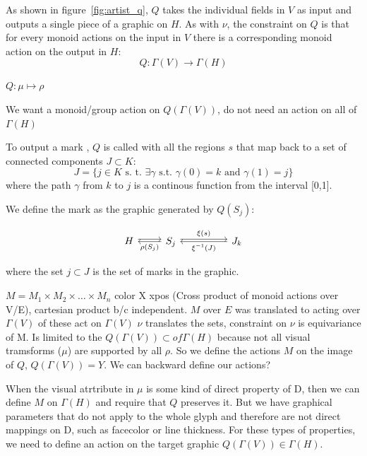 \documentclass[../main.tex]{subfiles}
\begin{document}
As shown in figure~\ref{fig:artist_q}, $Q$ takes the individual fields in $V$ as input and outputs a single piece of a graphic on $H$. As with $\nu$, the constraint on $Q$ is that for every monoid actions on the input in $V$ there is a corresponding monoid action on the output in $H$:
\begin{equation}
    Q: \Gamma(V) \rightarrow \Gamma(H)
\end{equation}

$Q: \mu \mapsto \rho$

We want a monoid/group action on $Q(\Gamma(V))$, do not need an action on all of $\Gamma(H)$


To output a mark  \cite{bertinIIPropertiesGraphic2011,carpendaleVisualRepresentationSemiology}, $Q$ is called with all the regions $s$ that map back to a set of connected components $J \subset K$:
\begin{equation}
J = \{j \in K \text{ s. t. } \exists \gamma \text{ s.t. } \gamma(0)=k \text{ and }\gamma(1)=j\}
\end{equation}
where the path\cite{ConnectedSpace2020}  $\gamma$ from $k$ to $j$ is a continous function from the interval [0,1].

We define the mark as the graphic generated by $Q(S_j)$:

\begin{equation}
    \begin{tikzcd}
        H \arrow[r, shift left] & S_j \arrow[rr, "\xi(s)", shift left] \arrow[l, "\rho(S_j)"] &  & J_{k} \arrow[ll, "\xi^{-1}(J)"]
        \end{tikzcd}
    \label{eq:mark}
\end{equation}

where the set $j \subset J$ is the set of marks in the graphic.

$M = M_{1} \times M_{2} \times \ldots \times M_{n}$
color X xpos (Cross product of monoid actions over V/E), cartesian product b/c independent. $M$ over $E$ was translated to acting over $\Gamma(V)$ of these act on $\Gamma(V)$
$\nu$ translates the sets, constraint on $\nu$ is equivariance of M. Is limited to the $Q(\Gamma(V))\subset of \Gamma(H)$ because not all visual tramsforms ($\mu$) are supported by all  $\rho$.
So we define the actions $M$ on the image of $Q$, $Q(\Gamma(V)) = Y$. We can backward define our actions?

When the visual atrtribute in $\mu$ is some kind of direct property of D, then we can define $M$ on $\Gamma(H)$ and require that $Q$ preserves it. But we have graphical parameters that do not apply to the whole glyph and therefore are not direct mappings on D, such as facecolor or line thickness. For these types of properties, we need to define an action on the target graphic $Q(\Gamma(V)) \in \Gamma(H)$.
\end{document}

